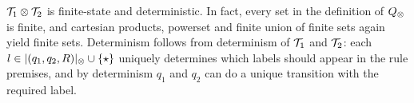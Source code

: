 %

\begin{remark}
\label{rem:syncp-fin-det}
$\mathcal{T}_1 \otimes \mathcal{T}_2$ is finite-state and deterministic. In fact, every set in the definition of $Q_{\otimes}$ is finite, and cartesian products, powerset and finite union of finite sets again yield finite sets. Determinism follows from determinism of $\mathcal{T}_1$ and $\mathcal{T}_2$: each $l \in |(q_1,q_2,R)|_{\otimes} \cup \{\star\}$ uniquely determines which labels should appear in the rule premises, and by determinism $q_1$ and $q_2$ can do a unique transition with the required label.
\end{remark}
%



%


